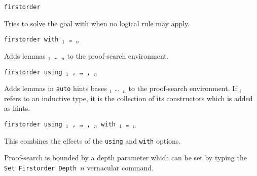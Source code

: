 \begin{Variants}
 \item {\tt firstorder {\tac}}

   Tries to solve the goal with {\tac} when no logical rule may apply.

 \item {\tt firstorder with \ident$_1$ \dots\ \ident$_n$ }

   Adds lemmas \ident$_1$ \dots\ \ident$_n$ to the proof-search
   environment.

 \item {\tt firstorder using {\qualid}$_1$ , \dots\ , {\qualid}$_n$ }

   Adds lemmas in {\tt auto} hints bases {\qualid}$_1$ \dots\ {\qualid}$_n$
   to the proof-search environment. If {\qualid}$_i$ refers to an inductive
   type, it is the collection of its constructors which is added as hints.

\item \texttt{firstorder using {\qualid}$_1$ , \dots\ , {\qualid}$_n$ with \ident$_1$ \dots\ \ident$_n$}

  This combines the effects of the {\tt using} and {\tt with} options.

\end{Variants}

Proof-search is bounded by a depth parameter which can be set by typing the
{\nobreak \tt Set Firstorder Depth $n$}  
vernacular command.






